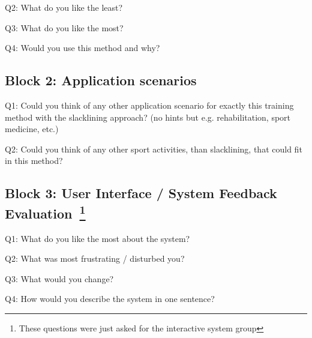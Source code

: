 \begin{appendices}
Q2: What do you like the least?

Q3: What do you like the most?

Q4: Would you use this method and why?\\

\subsection*{Block 2: Application scenarios}
Q1: Could you think of any other application scenario for exactly this training method with the slacklining approach? (no hints but e.g. rehabilitation, sport medicine, etc.)

Q2: Could you think of any other sport activities, than slacklining, that could fit in this method?\\

\subsection*{Block 3: User Interface / System Feedback Evaluation~\footnote{These questions were just asked for the interactive system group}}
Q1: What do you like the most about the system?

Q2: What was most frustrating / disturbed you?

Q3: What would you change?

Q4: How would you describe the system in one sentence?


\end{appendices}
